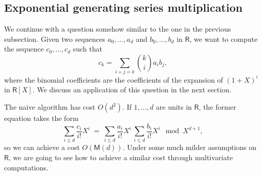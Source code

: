 \documentclass[amsthm]{elsart}
\def\M {\ensuremath{\mathsf{M}}}
\def\rng {\ensuremath{\mathsf{R}}}
\theoremstyle{plain}
\begin{document}
\subsection{Exponential generating series multiplication}\label{ssec:expo}

We continue with a question somehow similar to the one in the previous
subsection. Given two sequences $a_0,\dots,a_d$ and $b_0,\dots,b_d$ in
$\rng$, we want to compute the sequence $c_0,\dots,c_d$ such that
\begin{equation}
  \label{eq:power0}
c_k =\sum_{i+j=k} {k \choose i} a_i b_{j},
\end{equation}
where the binomial coefficients are the coefficients of the expansion
of $(1+X)^i$ in $\rng[X]$. We discuss an application of this question
in the next section.

The naive algorithm has cost $O(d^2)$. If $1,\dots,d$ are units in
$\rng$, the former equation takes the form
\begin{equation}
  \label{eq:power}
 \sum_{i \le d} \frac{c_i}{i!}X^i\ =\ \sum_{i\le d} \frac{a_i}{i!}X^i\, \sum_{i \le d} \frac{b_i}{i!}X^i \mod X^{d+1},
\end{equation}
so we can achieve a cost $O(\M(d))$. Under some much milder
assumptions on $\rng$, we are going to see how to achieve a similar
cost through multivariate computations.
\end{document}
